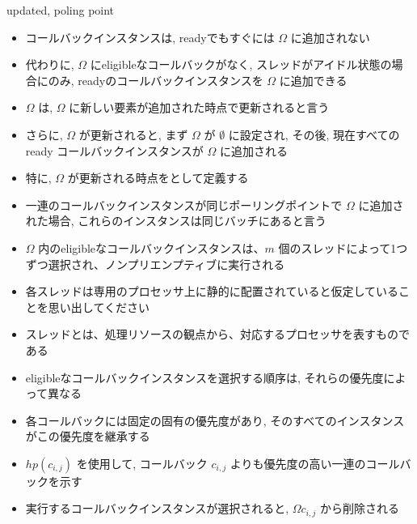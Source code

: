 \begin{frame}{updated, poling point}
    \begin{itemize}
        \item コールバックインスタンスは, readyでもすぐには $\Omega$ に追加されない
        \item 代わりに, $\Omega$ にeligibleなコールバックがなく, スレッドがアイドル状態の場合にのみ, readyのコールバックインスタンスを $\Omega$ に追加できる
        \item $\Omega$ は, $\Omega$ に新しい要素が追加された時点で更新されると言う
        \item さらに, $\Omega$ が更新されると, まず $\Omega$ が $\emptyset$ に設定され, その後, 現在すべての ready コールバックインスタンスが $\Omega$ に追加される
        \item 特に, $\Omega$ が更新される時点をとして定義する
        \item 一連のコールバックインスタンスが同じポーリングポイントで $\Omega$ に追加された場合, これらのインスタンスは同じバッチにあると言う
    \end{itemize}
\end{frame}

\begin{frame}{}
    \begin{itemize}
        \item $\Omega$ 内のeligibleなコールバックインスタンスは、$m$ 個のスレッドによって1つずつ選択され、ノンプリエンプティブに実行される
        \item 各スレッドは専用のプロセッサ上に静的に配置されていると仮定していることを思い出してください
        \item スレッドとは、処理リソースの観点から、対応するプロセッサを表すものである
    \end{itemize}
\end{frame}

\begin{frame}{}
    \begin{itemize}
        \item eligibleなコールバックインスタンスを選択する順序は, それらの優先度によって異なる
        \item 各コールバックには固定の固有の優先度があり, そのすべてのインスタンスがこの優先度を継承する
        \item $h p\left(c_{i, j}\right)$ を使用して, コールバック $c_{i, j}$ よりも優先度の高い一連のコールバックを示す
        \item 実行するコールバックインスタンスが選択されると, $\Omega  c_{i, j}$ から削除される
    \end{itemize}
\end{frame}

